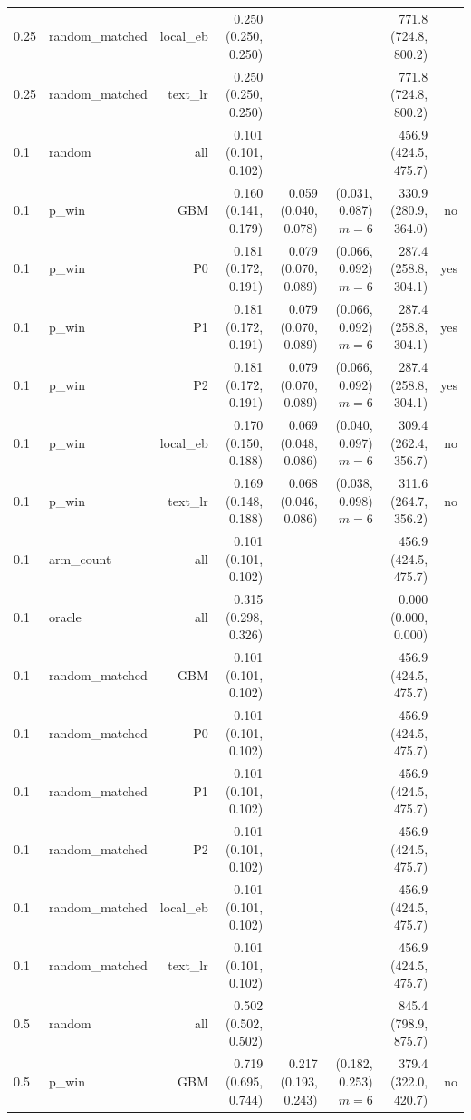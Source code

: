 \begin{tabular}{llrrrrrr}
0.25 & random\_matched & local\_eb & 0.250 (0.250, 0.250) &  &  & 771.8 (724.8, 800.2) &  \\
0.25 & random\_matched & text\_lr & 0.250 (0.250, 0.250) &  &  & 771.8 (724.8, 800.2) &  \\
0.1 & random & all & 0.101 (0.101, 0.102) &  &  & 456.9 (424.5, 475.7) &  \\
0.1 & p\_win & GBM & 0.160 (0.141, 0.179) & 0.059 (0.040, 0.078) & (0.031, 0.087) $m=6$ & 330.9 (280.9, 364.0) & no \\
0.1 & p\_win & P0 & 0.181 (0.172, 0.191) & 0.079 (0.070, 0.089) & (0.066, 0.092) $m=6$ & 287.4 (258.8, 304.1) & yes \\
0.1 & p\_win & P1 & 0.181 (0.172, 0.191) & 0.079 (0.070, 0.089) & (0.066, 0.092) $m=6$ & 287.4 (258.8, 304.1) & yes \\
0.1 & p\_win & P2 & 0.181 (0.172, 0.191) & 0.079 (0.070, 0.089) & (0.066, 0.092) $m=6$ & 287.4 (258.8, 304.1) & yes \\
0.1 & p\_win & local\_eb & 0.170 (0.150, 0.188) & 0.069 (0.048, 0.086) & (0.040, 0.097) $m=6$ & 309.4 (262.4, 356.7) & no \\
0.1 & p\_win & text\_lr & 0.169 (0.148, 0.188) & 0.068 (0.046, 0.086) & (0.038, 0.098) $m=6$ & 311.6 (264.7, 356.2) & no \\
0.1 & arm\_count & all & 0.101 (0.101, 0.102) &  &  & 456.9 (424.5, 475.7) &  \\
0.1 & oracle & all & 0.315 (0.298, 0.326) &  &  & 0.000 (0.000, 0.000) &  \\
0.1 & random\_matched & GBM & 0.101 (0.101, 0.102) &  &  & 456.9 (424.5, 475.7) &  \\
0.1 & random\_matched & P0 & 0.101 (0.101, 0.102) &  &  & 456.9 (424.5, 475.7) &  \\
0.1 & random\_matched & P1 & 0.101 (0.101, 0.102) &  &  & 456.9 (424.5, 475.7) &  \\
0.1 & random\_matched & P2 & 0.101 (0.101, 0.102) &  &  & 456.9 (424.5, 475.7) &  \\
0.1 & random\_matched & local\_eb & 0.101 (0.101, 0.102) &  &  & 456.9 (424.5, 475.7) &  \\
0.1 & random\_matched & text\_lr & 0.101 (0.101, 0.102) &  &  & 456.9 (424.5, 475.7) &  \\
0.5 & random & all & 0.502 (0.502, 0.502) &  &  & 845.4 (798.9, 875.7) &  \\
0.5 & p\_win & GBM & 0.719 (0.695, 0.744) & 0.217 (0.193, 0.243) & (0.182, 0.253) $m=6$ & 379.4 (322.0, 420.7) & no \\

\end{tabular}
